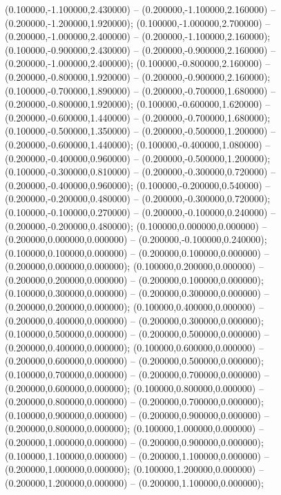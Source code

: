  (0.100000,-1.100000,2.430000) -- (0.200000,-1.100000,2.160000) -- (0.200000,-1.200000,1.920000);
 (0.100000,-1.000000,2.700000) -- (0.200000,-1.000000,2.400000) -- (0.200000,-1.100000,2.160000);
 (0.100000,-0.900000,2.430000) -- (0.200000,-0.900000,2.160000) -- (0.200000,-1.000000,2.400000);
 (0.100000,-0.800000,2.160000) -- (0.200000,-0.800000,1.920000) -- (0.200000,-0.900000,2.160000);
 (0.100000,-0.700000,1.890000) -- (0.200000,-0.700000,1.680000) -- (0.200000,-0.800000,1.920000);
 (0.100000,-0.600000,1.620000) -- (0.200000,-0.600000,1.440000) -- (0.200000,-0.700000,1.680000);
 (0.100000,-0.500000,1.350000) -- (0.200000,-0.500000,1.200000) -- (0.200000,-0.600000,1.440000);
 (0.100000,-0.400000,1.080000) -- (0.200000,-0.400000,0.960000) -- (0.200000,-0.500000,1.200000);
 (0.100000,-0.300000,0.810000) -- (0.200000,-0.300000,0.720000) -- (0.200000,-0.400000,0.960000);
 (0.100000,-0.200000,0.540000) -- (0.200000,-0.200000,0.480000) -- (0.200000,-0.300000,0.720000);
 (0.100000,-0.100000,0.270000) -- (0.200000,-0.100000,0.240000) -- (0.200000,-0.200000,0.480000);
 (0.100000,0.000000,0.000000) -- (0.200000,0.000000,0.000000) -- (0.200000,-0.100000,0.240000);
 (0.100000,0.100000,0.000000) -- (0.200000,0.100000,0.000000) -- (0.200000,0.000000,0.000000);
 (0.100000,0.200000,0.000000) -- (0.200000,0.200000,0.000000) -- (0.200000,0.100000,0.000000);
 (0.100000,0.300000,0.000000) -- (0.200000,0.300000,0.000000) -- (0.200000,0.200000,0.000000);
 (0.100000,0.400000,0.000000) -- (0.200000,0.400000,0.000000) -- (0.200000,0.300000,0.000000);
 (0.100000,0.500000,0.000000) -- (0.200000,0.500000,0.000000) -- (0.200000,0.400000,0.000000);
 (0.100000,0.600000,0.000000) -- (0.200000,0.600000,0.000000) -- (0.200000,0.500000,0.000000);
 (0.100000,0.700000,0.000000) -- (0.200000,0.700000,0.000000) -- (0.200000,0.600000,0.000000);
 (0.100000,0.800000,0.000000) -- (0.200000,0.800000,0.000000) -- (0.200000,0.700000,0.000000);
 (0.100000,0.900000,0.000000) -- (0.200000,0.900000,0.000000) -- (0.200000,0.800000,0.000000);
 (0.100000,1.000000,0.000000) -- (0.200000,1.000000,0.000000) -- (0.200000,0.900000,0.000000);
 (0.100000,1.100000,0.000000) -- (0.200000,1.100000,0.000000) -- (0.200000,1.000000,0.000000);
 (0.100000,1.200000,0.000000) -- (0.200000,1.200000,0.000000) -- (0.200000,1.100000,0.000000);
